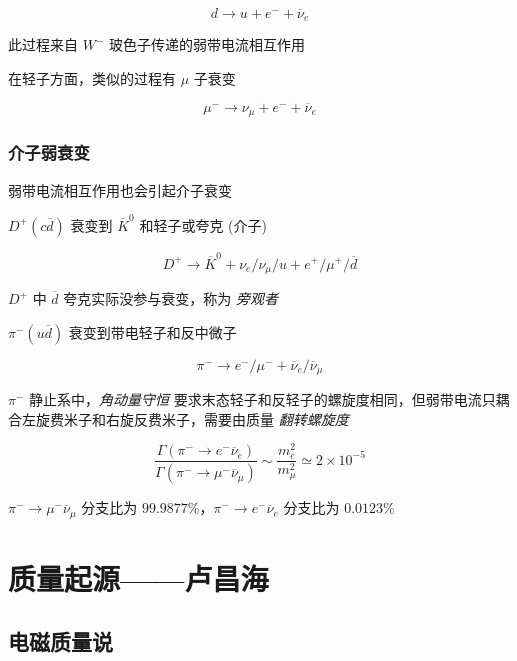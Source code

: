 \documentclass[oneside,a4paper,openany,11pt]{ctexbook}
\begin{document}
\begin{equation}
    d \to u + e^- + \overline{\nu}_e
\end{equation}

此过程来自 $W^-$ 玻色子传递的弱带电流相互作用

在轻子方面，类似的过程有 $\mu$ 子衰变

\begin{equation}
    \mu^- \to \nu_\mu + e^- + \overline{\nu}_e
\end{equation}

\subsection{介子弱衰变}

弱带电流相互作用也会引起介子衰变

$D^+(c\overline{d})$ 衰变到 $\overline{K}^0$ 和轻子或夸克 (介子)

\begin{equation}
    D^+ \to \overline{K}^0 + \nu_e / \nu_\mu / u + e^+ / \mu^+ / \overline{d}
\end{equation}

$D^+$ 中 $\overline{d}$ 夸克实际没参与衰变，称为 \emph{旁观者}

$\pi^-(u\overline{d})$ 衰变到带电轻子和反中微子

\begin{equation}
    \pi^- \to e^- / \mu^- + \overline{\nu}_e / \overline{\nu}_\mu
\end{equation}

$\pi^-$ 静止系中，\emph{角动量守恒} 要求末态轻子和反轻子的螺旋度相同，但弱带电流只耦合左旋费米子和右旋反费米子，需要由质量 \emph{翻转螺旋度}

\begin{equation}
    \frac{\Gamma(\pi^- \to e^- \overline{\nu}_e)}{\Gamma(\pi^- \to \mu^- \overline{\nu}_\mu)} \sim \frac{m_e^2}{m_\mu^2} \simeq 2 \times 10^{-5}
\end{equation}

$\pi^- \to \mu^- \overline{\nu}_\mu$ 分支比为 $99.9877\%$，$\pi^- \to e^- \overline{\nu}_e$ 分支比为 $0.0123\%$

\chapter{质量起源——卢昌海}

\section{电磁质量说}
\end{document}
